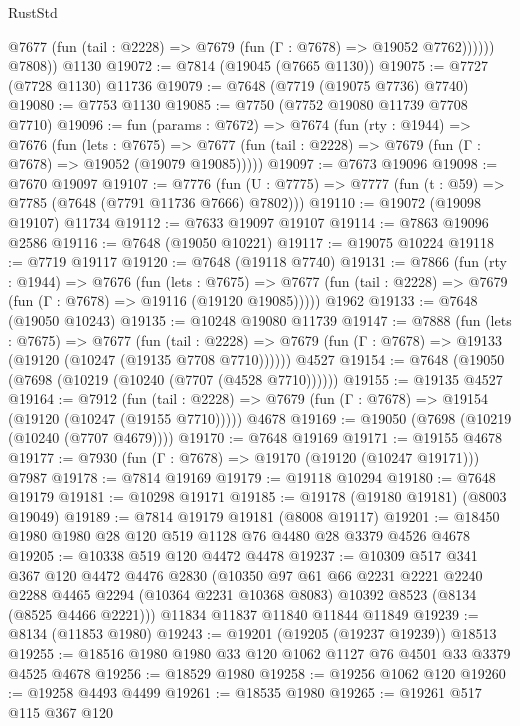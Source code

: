 \begin{lexlean}{RustStd}
\begin{coremodule}
{\begin{coremodule}
{{{{{{{{{{{{{{{{{{{{{{{{{{{{{{{{{{{{{{{{{{{{{{{{{{{{{              @7677 (fun (tail : @2228) => @7679 (fun (Γ : @7678) => @19052 @7762))))))
        @7808))
    @1130
@19072 := @7814 (@19045 (@7665 @1130))
@19075 := @7727 (@7728 @1130) @11736
@19079 := @7648 (@7719 (@19075 @7736) @7740)
@19080 := @7753 @1130
@19085 := @7750 (@7752 @19080 @11739 @7708 @7710)
@19096 := fun (params : @7672) =>
  @7674
    (fun (rty : @1944) =>
    @7676
      (fun (lets : @7675) =>
      @7677 (fun (tail : @2228) => @7679 (fun (Γ : @7678) => @19052 (@19079 @19085)))))
@19097 := @7673 @19096
@19098 := @7670 @19097
@19107 := @7776
    (fun (U : @7775) => @7777 (fun (t : @59) => @7785 (@7648 (@7791 @11736 @7666) @7802)))
@19110 := @19072 (@19098 @19107) @11734
@19112 := @7633 @19097 @19107
@19114 := @7863 @19096 @2586
@19116 := @7648 (@19050 @10221)
@19117 := @19075 @10224
@19118 := @7719 @19117
@19120 := @7648 (@19118 @7740)
@19131 := @7866
    (fun (rty : @1944) =>
    @7676
      (fun (lets : @7675) =>
      @7677 (fun (tail : @2228) => @7679 (fun (Γ : @7678) => @19116 (@19120 @19085)))))
    @1962
@19133 := @7648 (@19050 @10243)
@19135 := @10248 @19080 @11739
@19147 := @7888
    (fun (lets : @7675) =>
    @7677
      (fun (tail : @2228) =>
      @7679 (fun (Γ : @7678) => @19133 (@19120 (@10247 (@19135 @7708 @7710))))))
    @4527
@19154 := @7648 (@19050 (@7698 (@10219 (@10240 (@7707 (@4528 @7710))))))
@19155 := @19135 @4527
@19164 := @7912
    (fun (tail : @2228) => @7679 (fun (Γ : @7678) => @19154 (@19120 (@10247 (@19155 @7710)))))
    @4678
@19169 := @19050 (@7698 (@10219 (@10240 (@7707 @4679))))
@19170 := @7648 @19169
@19171 := @19155 @4678
@19177 := @7930 (fun (Γ : @7678) => @19170 (@19120 (@10247 @19171))) @7987
@19178 := @7814 @19169
@19179 := @19118 @10294
@19180 := @7648 @19179
@19181 := @10298 @19171
@19185 := @19178 (@19180 @19181) (@8003 @19049)
@19189 := @7814 @19179 @19181 (@8008 @19117)
@19201 := @18450 @1980 @1980 @28 @120 @519 @1128 @76 @4480 @28 @3379 @4526 @4678
@19205 := @10338 @519 @120 @4472 @4478
@19237 := @10309
    @517
    @341
    @367
    @120
    @4472
    @4476
    @2830
    (@10350
      @97
      @61
      @66
      @2231
      @2221
      @2240
      @2288
      @4465
      @2294
      (@10364 @2231 @10368 @8083)
      @10392
      @8523
      (@8134 (@8525 @4466 @2221)))
    @11834
    @11837
    @11840
    @11844
    @11849
@19239 := @8134 (@11853 @1980)
@19243 := @19201 (@19205 (@19237 @19239)) @18513
@19255 := @18516 @1980 @1980 @33 @120 @1062 @1127 @76 @4501 @33 @3379 @4525 @4678
@19256 := @18529 @1980
@19258 := @19256 @1062 @120
@19260 := @19258 @4493 @4499
@19261 := @18535 @1980
@19265 := @19261 @517 @115 @367 @120
}}}}}}}}}}}}}}}}}}}}}}}}}}}}}}}}}}}}}}}}}}}}}}}}}}}}}
\end{coremodule}}
\end{coremodule}
\end{lexlean}
